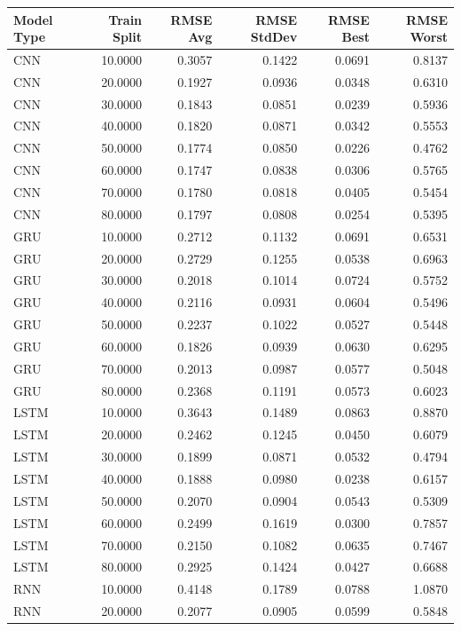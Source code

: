 \begin{tabular}{lrrrrr}
\toprule
Model Type & Train Split & RMSE Avg & RMSE StdDev & RMSE Best & RMSE Worst \\
\midrule
CNN & 10.0000 & 0.3057 & 0.1422 & 0.0691 & 0.8137 \\
CNN & 20.0000 & 0.1927 & 0.0936 & 0.0348 & 0.6310 \\
CNN & 30.0000 & 0.1843 & 0.0851 & 0.0239 & 0.5936 \\
CNN & 40.0000 & 0.1820 & 0.0871 & 0.0342 & 0.5553 \\
CNN & 50.0000 & 0.1774 & 0.0850 & 0.0226 & 0.4762 \\
CNN & 60.0000 & 0.1747 & 0.0838 & 0.0306 & 0.5765 \\
CNN & 70.0000 & 0.1780 & 0.0818 & 0.0405 & 0.5454 \\
CNN & 80.0000 & 0.1797 & 0.0808 & 0.0254 & 0.5395 \\
GRU & 10.0000 & 0.2712 & 0.1132 & 0.0691 & 0.6531 \\
GRU & 20.0000 & 0.2729 & 0.1255 & 0.0538 & 0.6963 \\
GRU & 30.0000 & 0.2018 & 0.1014 & 0.0724 & 0.5752 \\
GRU & 40.0000 & 0.2116 & 0.0931 & 0.0604 & 0.5496 \\
GRU & 50.0000 & 0.2237 & 0.1022 & 0.0527 & 0.5448 \\
GRU & 60.0000 & 0.1826 & 0.0939 & 0.0630 & 0.6295 \\
GRU & 70.0000 & 0.2013 & 0.0987 & 0.0577 & 0.5048 \\
GRU & 80.0000 & 0.2368 & 0.1191 & 0.0573 & 0.6023 \\
LSTM & 10.0000 & 0.3643 & 0.1489 & 0.0863 & 0.8870 \\
LSTM & 20.0000 & 0.2462 & 0.1245 & 0.0450 & 0.6079 \\
LSTM & 30.0000 & 0.1899 & 0.0871 & 0.0532 & 0.4794 \\
LSTM & 40.0000 & 0.1888 & 0.0980 & 0.0238 & 0.6157 \\
LSTM & 50.0000 & 0.2070 & 0.0904 & 0.0543 & 0.5309 \\
LSTM & 60.0000 & 0.2499 & 0.1619 & 0.0300 & 0.7857 \\
LSTM & 70.0000 & 0.2150 & 0.1082 & 0.0635 & 0.7467 \\
LSTM & 80.0000 & 0.2925 & 0.1424 & 0.0427 & 0.6688 \\
RNN & 10.0000 & 0.4148 & 0.1789 & 0.0788 & 1.0870 \\
RNN & 20.0000 & 0.2077 & 0.0905 & 0.0599 & 0.5848 \\

\end{tabular}
